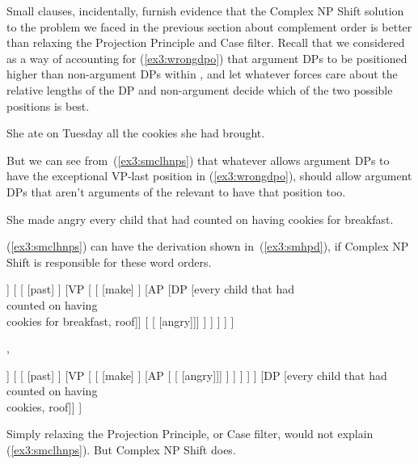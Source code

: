 Small clauses, incidentally, furnish evidence that the Complex NP Shift solution to the problem we faced in the previous section about complement order is better than relaxing the Projection Principle and Case filter. Recall that we considered as a way of accounting for (\ref{ex3:wrongdpo}) that argument DPs to be positioned higher than non-argument DPs within , and let whatever forces care about the relative lengths of the DP and non-argument decide which of the two possible positions is best.
\begin{exe}
	\raggedright
	\ex \label{ex3:wrongdpo} 
	She ate on Tuesday all the cookies she had brought.
\end{exe}
But we can see from~(\ref{ex3:smclhnps}) that whatever allows argument DPs to have the exceptional VP-last position in (\ref{ex3:wrongdpo}), should allow argument DPs that aren't arguments of the relevant  to have that position too.
\begin{exe}
	\raggedright
	\ex \label{ex3:smclhnps} 
	She made angry every child that had counted on having cookies for breakfast.
\end{exe}
(\ref{ex3:smclhnps}) can have the derivation shown in~(\ref{ex3:smhpd}), if Complex NP Shift is responsible for these word orders.
\begin{fullwidth}
\medskip
\begin{exe}
	\raggedright
	\ex \label{ex3:smhpd} 
	\small
	\begin{forest}
	[IP
		[DP [she, roof]]
		[ 
			[ [past] ]
			[VP [
				[ [make] ]
				[AP
					[DP [every child that had\\ counted on having\\ cookies for breakfast, roof]]
					[ [ [angry]]]
				 ]
			] ]
		]
	]
	\end{forest}
	{\Huge ,}
	\small
	\begin{forest}
	[IP
		[IP
		[DP [she, roof]]
		[ 
			[ [past] ]
			[VP [ 
				[ [make] ]
				[AP [ [ [angry]]] ]
			] ]
		]
		]
		[DP [every child that had\\ counted on having\\ cookies, roof]]
	]
	\end{forest}
\end{exe}
\medskip
\end{fullwidth}
Simply relaxing the Projection Principle, or Case filter, would not explain (\ref{ex3:smclhnps}). But Complex NP Shift does.

